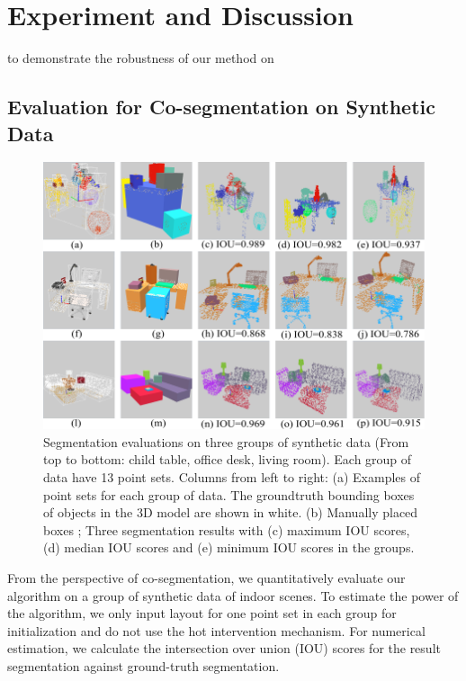 \section{Experiment and Discussion}
  to demonstrate the robustness of our method on 



\subsection{Evaluation for Co-segmentation on Synthetic Data}
\begin{figure}[htb]
	\centering
	\includegraphics[width=0.8\linewidth]{images/seg/seg}
	\caption{\label{fig:seg} Segmentation evaluations on three groups of synthetic data (From top to bottom: child table, office desk, living room). Each group of data have 13 point sets. Columns from left to right: (a) Examples of point sets for each group of data. The groundtruth bounding boxes of objects in the 3D model are shown in white. (b) Manually placed boxes ; Three segmentation results with (c) maximum IOU scores, (d) median IOU scores and (e) minimum IOU scores in the groups.}
\end{figure}
From the perspective of co-segmentation, we quantitatively evaluate our algorithm on a group of synthetic data of indoor scenes. 
%
To estimate the power of the algorithm, we only input layout for one point set in each group for initialization and do not use the hot intervention mechanism. 
%
For numerical estimation, we calculate the intersection over union (IOU) scores for the result segmentation against ground-truth segmentation. 
